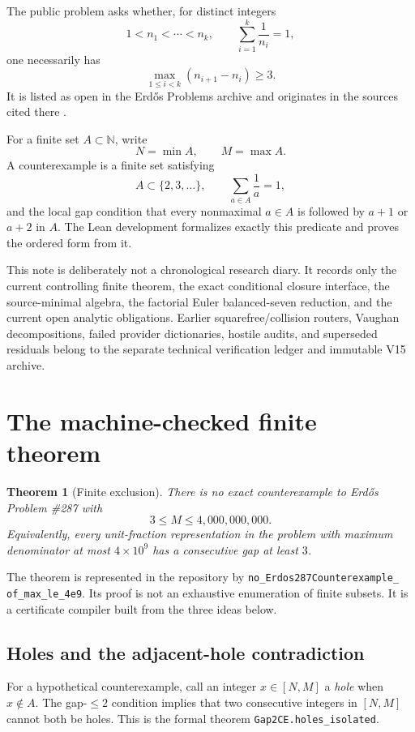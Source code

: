 \documentclass[11pt]{article}
\newtheorem{theorem}{Theorem}[section]
\theoremstyle{definition}
\newcommand{\N}{\mathbb N}
\newcommand{\1}{\mathbf 1}
\begin{document}
The public problem asks whether, for distinct integers
\[
1<n_1<\cdots<n_k,\qquad \sum_{i=1}^k\frac1{n_i}=1,
\]
one necessarily has
\[
\max_{1\le i<k}(n_{i+1}-n_i)\ge3.
\]
It is listed as open in the Erd\H{o}s Problems archive and originates in the sources
cited there \cite{ErdosGraham1980,ErdosProblems287}.

For a finite set $A\subset\N$, write
\[
N=\min A,\qquad M=\max A.
\]
A counterexample is a finite set satisfying
\[
A\subset\{2,3,\dots\},\qquad \sum_{a\in A}\frac1a=1,
\]
and the local gap condition that every nonmaximal $a\in A$ is followed by $a+1$ or $a+2$
in $A$.  The Lean development formalizes exactly this predicate and proves the ordered
form from it.

This note is deliberately not a chronological research diary.  It records only the
current controlling finite theorem, the exact conditional closure interface, the
source-minimal algebra, the factorial Euler balanced-seven reduction, and the current open
analytic obligations.  Earlier squarefree/collision routers, Vaughan decompositions, failed
provider dictionaries, hostile audits, and superseded residuals belong to the separate technical
verification ledger and immutable V15 archive.

\section{The machine-checked finite theorem}

\begin{theorem}[Finite exclusion]
There is no exact counterexample to Erd\H{o}s Problem \#287 with
\[
3\le M\le4{,}000{,}000{,}000.
\]
Equivalently, every unit-fraction representation in the problem with maximum denominator
at most $4\times10^9$ has a consecutive gap at least $3$.
\end{theorem}

The theorem is represented in the repository by
\texttt{no\_Erdos287Counterexample\_}\\\texttt{of\_max\_le\_4e9}.  Its proof is not an exhaustive
enumeration of finite subsets.  It is a certificate compiler built from the three ideas
below.

\subsection{Holes and the adjacent-hole contradiction}

For a hypothetical counterexample, call an integer $x\in[N,M]$ a \emph{hole} when
$x\notin A$.  The gap-$\le2$ condition implies that two consecutive integers in
$[N,M]$ cannot both be holes.  This is the formal theorem
\texttt{Gap2CE.holes\_isolated}.
\end{document}
